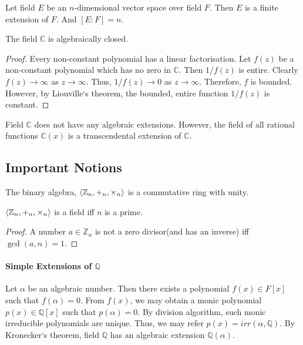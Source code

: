 \begin{definition}
	Let field $E$ be an $n$-dimensional vector space over field $F$. Then $E$ is a finite extension of $F$. And $[E:F] = n$.
\end{definition}

\begin{theorem}
	The field $\mathbb{C}$ is algebraically closed.
\end{theorem}
\begin{proof}
	Every non-constant polynomial has a linear factorisation.
	Let $f(z)$ be a non-constant polynomial which has no zero in $\mathbb{C}$. Then $1/f(z)$ is entire. Clearly $f(z) \to \infty$ as $z \to \infty$. Thus, $1/f(z) \to 0$ as $z \to \infty$. Therefore, $f$ is bounded. However, by Liouville`s theorem, the bounded, entire function $1/f(z)$ is constant.
\end{proof}

	Field $\mathbb{C}$ does not have any algebraic extensions. However, the field of all rational functions $\mathbb{C}(x)$ is a transcendental extension of $\mathbb{C}$.


\subsection{Important Notions}
	\par The binary algebra, $\left\langle \mathbb{Z}_n,+_n,\times_n \right\rangle$ is a commutative ring with unity. 

	\begin{theorem}
	$\left\langle \mathbb{Z}_n,+_n,\times_n \right\rangle$ is a field iff $n$ is a prime. 
	\end{theorem}
	\begin{proof}
		A number $a \in \mathbb{Z}_n$ is not a zero divisor(and has an inverse) iff $\gcd(a,n) = 1$.
	\end{proof}



\paragraph{Simple Extensions of $\mathbb{Q}$}
	Let $\alpha$ be an algebraic number. Then there exists a polynomial $f(x) \in F[x]$ such that $f(\alpha) = 0$.
	From $f(x)$, we may obtain a monic polynomial $p(x) \in \mathbb{Q}[x]$ such that $p(\alpha) = 0$.
	By division algorithm, such monic irreducible polynomials are unique.
	Thus, we may refer $p(x) = irr(\alpha,\mathbb{Q})$.
	By Kronecker`s theorem, field $\mathbb{Q}$ has an algebraic extension $\mathbb{Q}(\alpha)$.
	
